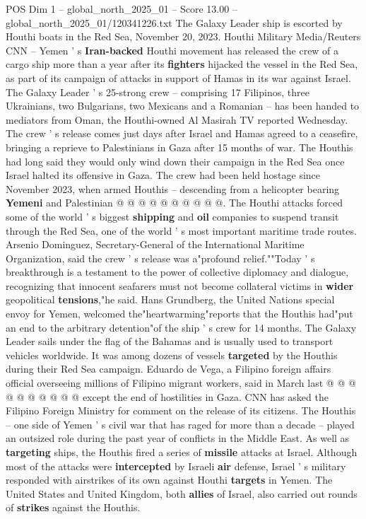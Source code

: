 \begin{textsample}{POS Dim 1 – global\_north\_2025\_01 – Score 13.00 – global\_north\_2025\_01/120341226.txt}  \label{ex:f1_pos_400}
The Galaxy Leader ship is escorted by Houthi boats in the Red Sea, November 20, 2023.
Houthi Military Media/Reuters CNN -- Yemen ' s \textbf{Iran-backed} Houthi movement has released the crew of a cargo ship more than a year after its \textbf{fighters} hijacked the vessel in the Red Sea, as part of its campaign of attacks in support of Hamas in its war against Israel.
The Galaxy Leader ' s 25-strong crew -- comprising 17 Filipinos, three Ukrainians, two Bulgarians, two Mexicans and a Romanian -- has been handed to mediators from Oman, the Houthi-owned Al Masirah TV reported Wednesday.
The crew ' s release comes just days after Israel and Hamas agreed to a ceasefire, bringing a reprieve to Palestinians in Gaza after 15 months of war.
The Houthis had long said they would only wind down their campaign in the Red Sea once Israel halted its offensive in Gaza.
The crew had been held hostage since November 2023, when armed Houthis -- descending from a helicopter bearing \textbf{Yemeni} and Palestinian @ @ @ @ @ @ @ @ @ @.
The Houthi attacks forced some of the world ' s biggest \textbf{shipping} and \textbf{oil} companies to suspend transit through the Red Sea, one of the world ' s most important maritime trade routes.
Arsenio Dominguez, Secretary-General of the International Maritime Organization, said the crew ' s release was a"profound relief.""Today ' s breakthrough is a testament to the power of collective diplomacy and dialogue, recognizing that innocent seafarers must not become collateral victims in \textbf{wider} geopolitical \textbf{tensions},"he said.
Hans Grundberg, the United Nations special envoy for Yemen, welcomed the"heartwarming"reports that the Houthis had"put an end to the arbitrary detention"of the ship ' s crew for 14 months.
The Galaxy Leader sails under the flag of the Bahamas and is usually used to transport vehicles worldwide.
It was among dozens of vessels \textbf{targeted} by the Houthis during their Red Sea campaign.
Eduardo de Vega, a Filipino foreign affairs official overseeing millions of Filipino migrant workers, said in March last @ @ @ @ @ @ @ @ @ @ except the end of hostilities in Gaza.
CNN has asked the Filipino Foreign Ministry for comment on the release of its citizens.
The Houthis -- one side of Yemen ' s civil war that has raged for more than a decade -- played an outsized role during the past year of conflicts in the Middle East.
As well as \textbf{targeting} ships, the Houthis fired a series of \textbf{missile} attacks at Israel.
Although most of the attacks were \textbf{intercepted} by Israeli \textbf{air} defense, Israel ' s military responded with airstrikes of its own against Houthi \textbf{targets} in Yemen.
The United States and United Kingdom, both \textbf{allies} of Israel, also carried out rounds of \textbf{strikes} against the Houthis.

\end{textsample}

